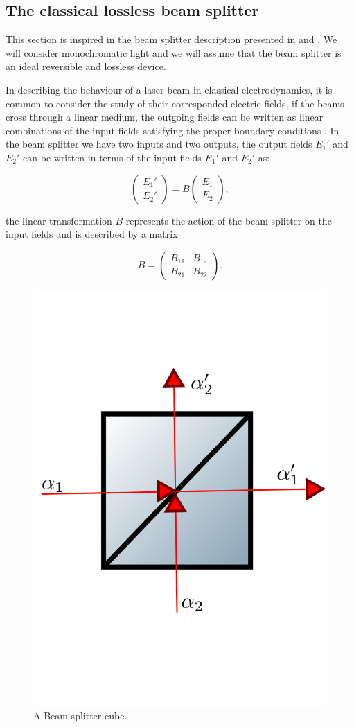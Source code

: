 \documentclass[12pt]{book}
\begin{document}
\subsection{The  classical lossless beam splitter}

This section is inspired in the beam splitter description presented in \cite{ludon} and \cite{leonhardt}. We will consider monochromatic light and we will assume that the beam splitter is an ideal reversible and lossless device.


In describing the behaviour of a laser beam in classical electrodynamics, it is common to consider the study of their corresponded electric fields, if the beams cross through a linear medium, the outgoing fields can be written as linear combinations of the input fields satisfying the proper boundary conditions \cite{jackson}. In the beam splitter we have two inputs and two outputs, the output fields $E_{1}'$ and $E_{2}'$  can be written in terms of the input fields $E_{1}'$ and $E_{2}'$ as:

\begin{equation}
\begin{pmatrix} E_{1}' \\ E_{2}' \end{pmatrix}=B\begin{pmatrix} E_{1} \\ E_{2} \end{pmatrix},\label{rule}
\end{equation}

the linear transformation $B$ represents the action of the beam splitter on the input fields and is described by a matrix:

\begin{equation}
B=\begin{pmatrix} B_{11}& B_{12} \\B_{21} & B_{22} \end{pmatrix}.
\end{equation}

\begin{figure}[t!]
\centering
\includegraphics[width=5 cm,height=5 cm]{images/bS.png}
\caption{A Beam splitter cube.}
\label{fig:BS}
\end{figure}
\end{document}
